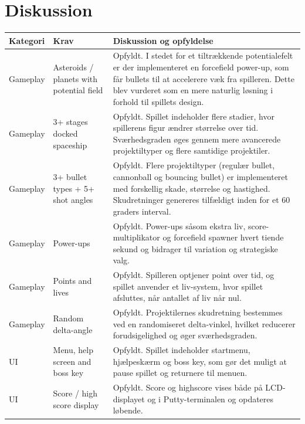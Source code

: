 \chapter{Diskussion} \label{chap:diskussion}
\begin{tabular}{|p{2.4cm}|p{3.6cm}|p{7.4cm}|}
\hline
\textbf{Kategori} & \textbf{Krav} & \textbf{Diskussion og opfyldelse} \\
\hline

Gameplay &
Asteroids / planets with potential field &
Opfyldt. I stedet for et tiltrækkende potentialefelt er der implementeret en forcefield power-up, som får bullets til at accelerere væk fra spilleren. Dette blev vurderet som en mere naturlig løsning i forhold til spillets design. \\
\hline

Gameplay &
3+ stages docked spaceship &
Opfyldt. Spillet indeholder flere stadier, hvor spillerens figur ændrer størrelse over tid. Sværhedsgraden øges gennem mere avancerede projektiltyper og flere samtidige projektiler. \\
\hline

Gameplay &
3+ bullet types + 5+ shot angles &
Opfyldt. Flere projektiltyper (regulær bullet, cannonball og bouncing bullet) er implementeret med forskellig skade, størrelse og hastighed. Skudretninger genereres tilfældigt inden for et 60 graders interval. \\
\hline

Gameplay &
Power-ups &
Opfyldt. Power-ups såsom ekstra liv, score-multiplikator og forcefield spawner hvert tiende sekund og bidrager til variation og strategiske valg. \\
\hline

Gameplay &
Points and lives &
Opfyldt. Spilleren optjener point over tid, og spillet anvender et liv-system, hvor spillet afsluttes, når antallet af liv når nul. \\
\hline

Gameplay &
Random delta-angle &
Opfyldt. Projektilernes skudretning bestemmes ved en randomiseret delta-vinkel, hvilket reducerer forudsigelighed og øger sværhedsgraden. \\
\hline

UI &
Menu, help screen and boss key &
Opfyldt. Spillet indeholder startmenu, hjælpeskærm og boss key, som gør det muligt at pause spillet og returnere til menuen. \\
\hline

UI &
Score / high score display &
Opfyldt. Score og highscore vises både på LCD-displayet og i Putty-terminalen og opdateres løbende. \\
\hline


\end{tabular}
